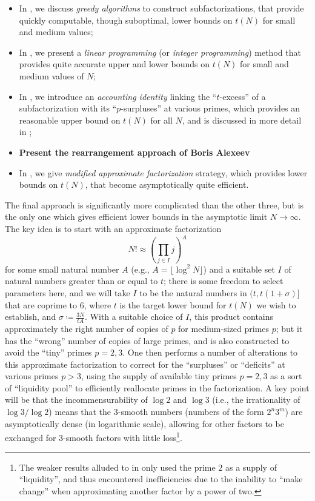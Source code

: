 \documentclass[12pt,a4paper,reqno]{amsart}
\numberwithin{equation}{section}
\theoremstyle{plain}
\theoremstyle{definition}
\begin{document}
\begin{itemize}
  \item In , we discuss \emph{greedy algorithms} to construct subfactorizations, that provide quickly computable, though suboptimal, lower bounds on $t(N)$ for small and medium values;
  \item In , we present a \emph{linear programming} (or \emph{integer programming}) method that provides quite accurate upper and lower bounds on $t(N)$ for small and medium values of $N$;
  \item In , we introduce an \emph{accounting identity} linking the ``$t$-excess'' of a subfactorization with its ``$p$-surpluses'' at various primes, which provides an reasonable upper bound on $t(N)$ for all $N$, and is discussed in more detail in ;
  \item {\bf Present the rearrangement approach of Boris Alexeev}
  \item In , we give \emph{modified approximate factorization} strategy, which provides lower bounds on $t(N)$, that become asymptotically quite efficient.
\end{itemize}

The final approach is significantly more complicated than the other three, but is the only one which gives efficient lower bounds in the asymptotic limit $N \to \infty$.  The key idea is to start with an approximate factorization
$$ N! \approx \left(\prod_{j \in I} j\right)^A$$
for some small natural number $A$ (e.g., $A = \lfloor \log^2 N \rfloor$) and a suitable set $I$ of natural numbers greater than or equal to $t$; there is some freedom to select parameters here, and we will take $I$ to be the natural numbers in $(t, t(1+\sigma)]$ that are coprime to $6$, where $t$ is the target lower bound for $t(N)$ we wish to establish, and $\sigma \coloneqq \frac{3N}{tA}$.  With a suitable choice of $I$, this product contains approximately the right number of copies of $p$ for medium-sized primes $p$; but it has the ``wrong'' number of copies of large primes, and is also constructed to avoid the ``tiny'' primes $p=2,3$.  One then performs a number of alterations to this approximate factorization to correct for the ``surpluses'' or ``deficits'' at various primes $p>3$, using the supply of available tiny primes $p=2,3$ as a sort of ``liquidity pool'' to efficiently reallocate primes in the factorization.  A key point will be that the incommensurability of $\log 2$ and $\log 3$ (i.e., the irrationality of $\log 3/\log 2$) means that the $3$-smooth numbers (numbers of the form $2^n 3^m$) are asymptotically dense (in logarithmic scale), allowing for other factors to be exchanged for $3$-smooth factors with little loss\footnote{The weaker results alluded to in  only used the prime $2$ as a supply of ``liquidity'', and thus encountered inefficiencies due to the inability to ``make change'' when approximating another factor by a power of two.}.
\end{document}
